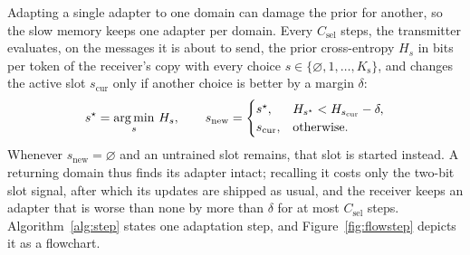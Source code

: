 Adapting a single adapter to one domain can damage the prior for another, so the slow memory keeps one adapter per domain. Every $C_\mathrm{sel}$ steps, the transmitter evaluates, on the messages it is about to send, the prior cross-entropy $H_s$ in bits per token of the receiver's copy with every choice $s\in\{\varnothing,1,\dots,K_\mathrm{s}\}$, and changes the active slot $s_\mathrm{cur}$ only if another choice is better by a margin $\delta$:
\begin{equation}
s^\star = \operatorname*{arg\,min}_{s}\,H_s,\qquad
s_\mathrm{new} = \begin{cases} s^\star, & H_{s^\star} < H_{s_\mathrm{cur}}-\delta,\\ s_\mathrm{cur}, & \text{otherwise}.\end{cases}
\label{eq:slot}
\end{equation}
Whenever $s_\mathrm{new} = \varnothing$ and an untrained slot remains, that slot is started instead. A returning domain thus finds its adapter intact; recalling it costs only the two-bit slot signal, after which its updates are shipped as usual, and the receiver keeps an adapter that is worse than none by more than $\delta$ for at most $C_\mathrm{sel}$ steps. Algorithm~\ref{alg:step} states one adaptation step, and Figure~\ref{fig:flowstep} depicts it as a flowchart.

